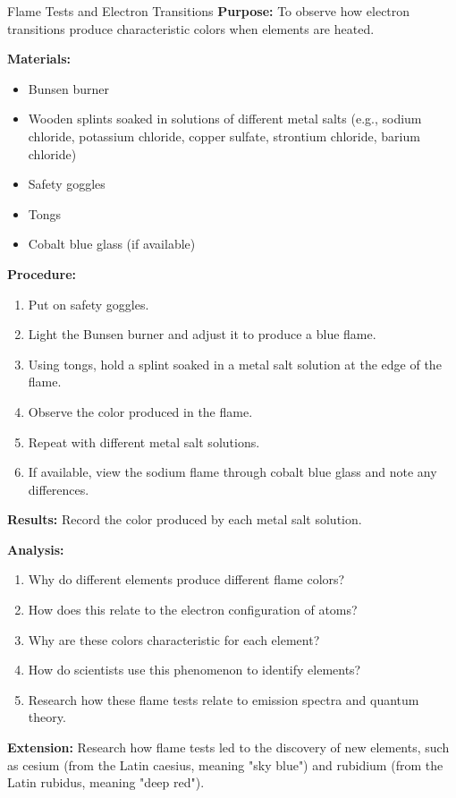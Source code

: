 \begin{investigation}{Flame Tests and Electron Transitions}
\textbf{Purpose:} To observe how electron transitions produce characteristic colors when elements are heated.

\textbf{Materials:}
\begin{itemize}
    \item Bunsen burner
    \item Wooden splints soaked in solutions of different metal salts (e.g., sodium chloride, potassium chloride, copper sulfate, strontium chloride, barium chloride)
    \item Safety goggles
    \item Tongs
    \item Cobalt blue glass (if available)
\end{itemize}

\textbf{Procedure:}
\begin{enumerate}
    \item Put on safety goggles.
    \item Light the Bunsen burner and adjust it to produce a blue flame.
    \item Using tongs, hold a splint soaked in a metal salt solution at the edge of the flame.
    \item Observe the color produced in the flame.
    \item Repeat with different metal salt solutions.
    \item If available, view the sodium flame through cobalt blue glass and note any differences.
\end{enumerate}

\textbf{Results:}
Record the color produced by each metal salt solution.

\textbf{Analysis:}
\begin{enumerate}
    \item Why do different elements produce different flame colors?
    \item How does this relate to the electron configuration of atoms?
    \item Why are these colors characteristic for each element?
    \item How do scientists use this phenomenon to identify elements?
    \item Research how these flame tests relate to emission spectra and quantum theory.
\end{enumerate}

\textbf{Extension:} Research how flame tests led to the discovery of new elements, such as cesium (from the Latin caesius, meaning "sky blue") and rubidium (from the Latin rubidus, meaning "deep red").
\end{investigation}

